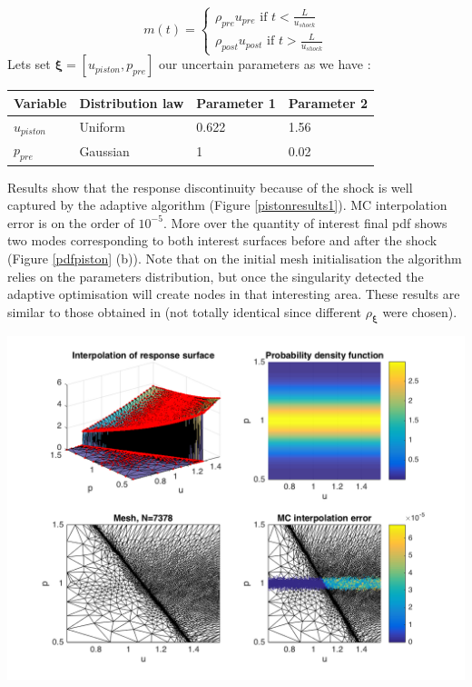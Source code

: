 \documentclass[11pt, a4paper, English]{report}
\begin{document}
\begin{appendix}
$$ m(t) = \left \{
\begin{array}{ll}
     \rho_{pre} u_{pre} \mbox{ if } t<\frac{L}{u_{shock}} \\
      \rho_{post} u_{post} \mbox{ if } t>\frac{L}{u_{shock}}
\end{array}
\right.
$$
Lets set $\boldsymbol{\xi} = [u_{piston}, p_{pre}]$ our uncertain parameters as we have :
\begin{table}[h!]
\centering
\begin{tabular}{l|l|l|l}
\hline
Variable     & Distribution law & Parameter 1 & Parameter 2 \\ \hline
$u_{piston}$ & Uniform          & 0.622       & 1.56        \\
$p_{pre}$    & Gaussian         & 1           & 0.02       
\end{tabular}
\end{table}

\begin{minipage}{0.5\textwidth}
Results show that the response discontinuity because of the shock is well captured by the adaptive algorithm (Figure \ref{pistonresults1}). MC interpolation error is on the order of $10^{-5}$. More over the quantity of interest final pdf shows two modes corresponding to both interest surfaces before and after the shock (Figure \ref{pdfpiston} (b)). Note that on the initial mesh initialisation the algorithm relies on the parameters distribution, but once the singularity detected the adaptive optimisation will create nodes in that interesting area. These results are similar to those obtained in \cite{PistonAnca} (not totally identical since different $\rho_{\boldsymbol{\xi}}$ were chosen).
\end{minipage}
\begin{minipage}{0.49\textwidth}
 \begin{center}
         \includegraphics[width = \textwidth]{piston1.png}
    \caption{Piston problem results}
    \label{pistonresults1}
 \end{center}


\end{minipage}
\end{appendix}
\end{document}
